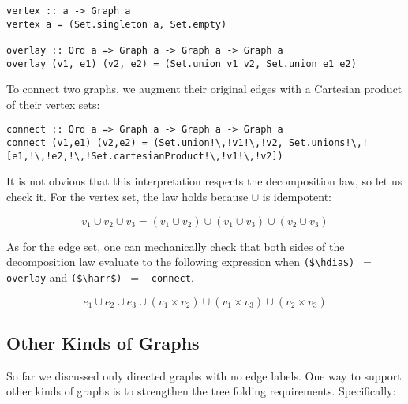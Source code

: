 \documentclass[crc,english]{programming}
\newcommand{\code}[1]{\lstinline[mathescape]|#1|}
\newcommand{\hcode}[1]{{\color{darkblue} \lstinline[keywordstyle={}]|#1|}} %
\newcommand{\hdia}{\,\text{\raisebox{-0.2mm}{\Large\color{darkblue} $\diamond$}}\,}
\newcommand{\harr}{\,\text{\color{darkblue} $\rightarrow$}\,}
\begin{document}
\begin{lstlisting}
vertex :: a -> Graph a
vertex a = (Set.singleton a, Set.empty)

overlay :: Ord a => Graph a -> Graph a -> Graph a
overlay (v1, e1) (v2, e2) = (Set.union v1 v2, Set.union e1 e2)
\end{lstlisting}

\noindent
To connect two graphs, we augment their original edges with a Cartesian product
of their vertex sets:

\begin{lstlisting}
connect :: Ord a => Graph a -> Graph a -> Graph a
connect (v1,e1) (v2,e2) = (Set.union!\,!v1!\,!v2, Set.unions!\,![e1,!\,!e2,!\,!Set.cartesianProduct!\,!v1!\,!v2])
\end{lstlisting}

\noindent
It is not obvious that this interpretation respects the decomposition law, so
let us check it. For the vertex set, the law holds because $\cup$ is idempotent:

\vspace{-5mm}
\begin{equation*}
v_1 \cup v_2 \cup v_3 = (v_1 \cup v_2) \cup (v_1 \cup v_3) \cup (v_2 \cup v_3)
\end{equation*}
\vspace{-5mm}

\noindent
As for the edge set, one can mechanically check that both sides of the
decomposition law evaluate to the following expression when
\code{($\hdia$)}~$=$~\hcode{overlay} and \code{($\harr$)}~$=$~\hcode{connect}.

\vspace{-5mm}
\begin{equation*}
e_1 \cup e_2 \cup e_3 \cup (v_1 \times v_2) \cup (v_1 \times v_3) \cup (v_2 \times v_3)
\end{equation*}
\vspace{-5mm}

\subsection{Other Kinds of Graphs}\label{sec-other-graphs}

So far we discussed only directed graphs with no edge labels. One way to support
other kinds of graphs is to strengthen the tree folding requirements.
Specifically:
\end{document}
